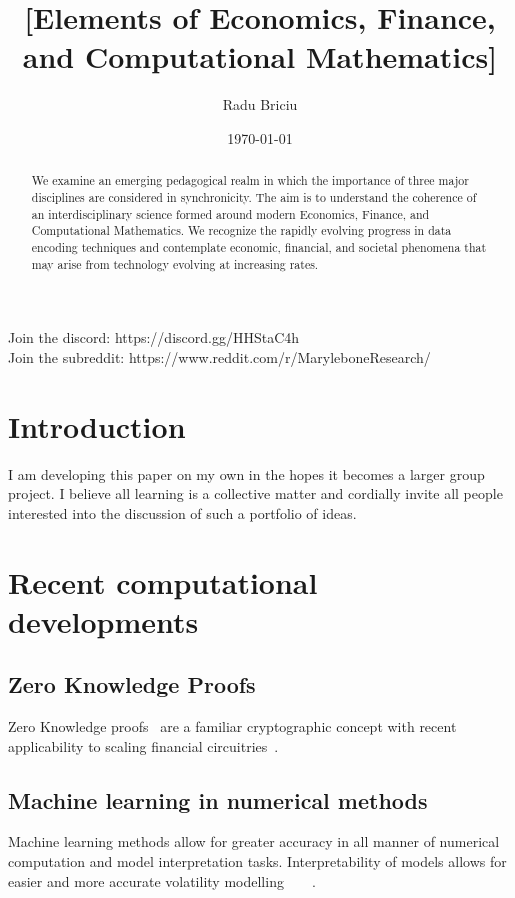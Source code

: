 \documentclass[11pt]{article}
\title{[Elements of Economics, Finance, and Computational Mathematics]}
\date{\today}
\author{Radu Briciu}
\begin{document}
\nocite{*}
\maketitle
\newpage
\begin{abstract}
	\noindent
	We examine an emerging pedagogical realm in which the importance of three major disciplines are considered in synchronicity. The aim is to understand the coherence of an interdisciplinary science formed around modern Economics, Finance, and Computational Mathematics. We recognize the rapidly evolving progress in data encoding techniques and contemplate economic, financial, and societal phenomena that may arise from technology evolving at increasing rates.
\end{abstract}
\vspace{5em}
Join the discord: https://discord.gg/HHStaC4h\\
Join the subreddit: https://www.reddit.com/r/MaryleboneResearch/


\newpage
\tableofcontents	
\newpage

\section{Introduction}
I am developing this paper on my own in the hopes it becomes a larger group project. I believe all learning is a collective matter and cordially invite all people interested into the discussion of such a portfolio of ideas.

\section{Recent computational developments}
\subsection{Zero Knowledge Proofs}
Zero Knowledge proofs~\cite{ernstberger_2024_do} are a familiar cryptographic concept with recent applicability to scaling financial circuitries~\cite{leethorp_2022_fnet}.
\subsection{Machine learning in numerical methods}
Machine learning methods allow for greater accuracy in all manner of numerical computation and model interpretation tasks. Interpretability of models allows for easier and more accurate volatility modelling~\cite{beck_2019_machine}~\cite{kirenz_2022_using}~\cite{parr_2021_partial}~\cite{yuan_2024_deep}.
\end{document}
